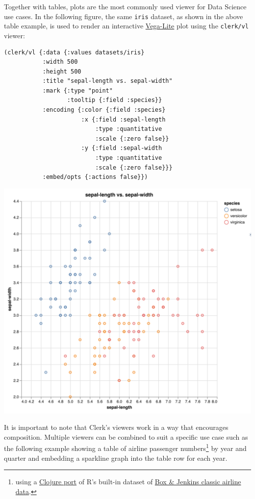 \documentclass[sigconf,screen]{acmart}
\newcommand{\passthrough}[1]{#1}
\begin{document}
Together with tables, plots are the most commonly used viewer for Data Science use cases. In the following figure, the same \passthrough{\lstinline!iris!} dataset, as shown in the above table example, is used to render an interactive \href{https://vega.github.io/vega-lite/}{Vega-Lite} plot using the \passthrough{\lstinline!clerk/vl!} viewer:

\begin{minipage}{\linewidth}
\begin{lstlisting}
(clerk/vl {:data {:values datasets/iris}
           :width 500
           :height 500
           :title "sepal-length vs. sepal-width"
           :mark {:type "point"
                  :tooltip {:field :species}}
           :encoding {:color {:field :species}
                      :x {:field :sepal-length
                          :type :quantitative
                          :scale {:zero false}}
                      :y {:field :sepal-width
                          :type :quantitative
                          :scale {:zero false}}}
           :embed/opts {:actions false}})
\end{lstlisting}
\end{minipage}

\includegraphics{images/anon-expr-5dtjeGHWCqJb9X8RfQtspB6Cyeo8Yv-result.png}

It is important to note that Clerk's viewers work in a way that encourages composition. Multiple viewers can be combined to suit a specific use case such as the following example showing a table of airline passenger numbers\footnote{using a \href{https://github.com/applied-science/edn-datasets}{Clojure port} of R's built-in dataset of \href{https://search.r-project.org/R/refmans/datasets/html/AirPassengers.html}{Box \& Jenkins classic airline data}.} by year and quarter and embedding a sparkline graph into the table row for each year.
\end{document}
